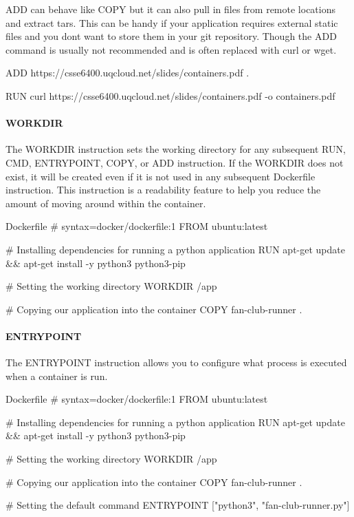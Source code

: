 \documentclass{csse4400}
\begin{document}
ADD can behave like COPY but it can also pull in files from remote locations and extract tars.
This can be handy if your application requires external static files and you dont want to store them in your git repository.
Though the ADD command is usually not recommended and is often replaced with curl or wget.

\begin{code}[language=docker,numbers=none]{}
ADD https://csse6400.uqcloud.net/slides/containers.pdf .
\end{code}
\begin{code}[language=docker,numbers=none]{}
RUN curl https://csse6400.uqcloud.net/slides/containers.pdf -o containers.pdf
\end{code}

\paragraph{WORKDIR}
The WORKDIR instruction sets the working directory for any subsequent RUN, CMD, ENTRYPOINT, COPY, or ADD instruction.
If the WORKDIR does not exist, it will be created even if it is not used in any subsequent Dockerfile instruction.
This instruction is a readability feature to help you reduce the amount of moving around within the container.

\begin{code}[language=docker,numbers=none]{Dockerfile}
# syntax=docker/dockerfile:1
FROM ubuntu:latest

# Installing dependencies for running a python application
RUN apt-get update && apt-get install -y python3 python3-pip

# Setting the working directory
WORKDIR /app

# Copying our application into the container
COPY fan-club-runner .
\end{code}


\paragraph{ENTRYPOINT}
The ENTRYPOINT instruction allows you to configure what process is executed when a container is run.

\begin{code}[language=docker,numbers=none]{Dockerfile}
# syntax=docker/dockerfile:1
FROM ubuntu:latest

# Installing dependencies for running a python application
RUN apt-get update && apt-get install -y python3 python3-pip

# Setting the working directory
WORKDIR /app

# Copying our application into the container
COPY fan-club-runner .

# Setting the default command
ENTRYPOINT ["python3", "fan-club-runner.py"]
\end{code}
\end{document}
